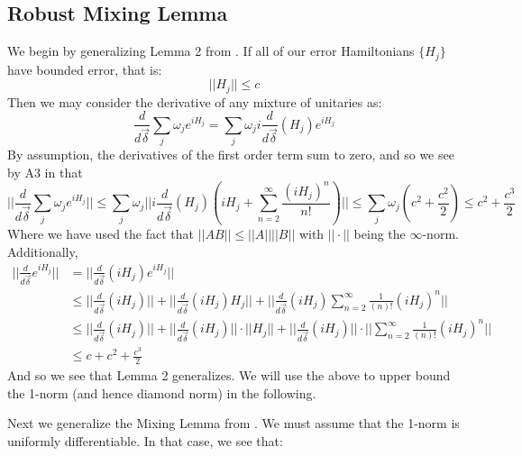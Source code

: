 \documentclass[aps,nofootinbib,pra,notitlepage,twocolumn]{revtex4-1}
\newcommand{\deriv}[0]{{\frac{d}{d\vec{\delta}}}}
\def\id{\mbox{\small 1} \!\! \mbox{1}}
\begin{document}
\subsection{Robust Mixing Lemma}
We begin by generalizing Lemma 2 from \cite{Campbell2017}. If all of our error Hamiltonians $\{H_j\}$ have bounded error, that is:
\begin{equation}
||H_j||\leq c
\end{equation}
Then we may consider the derivative of any mixture of unitaries as:
\begin{equation}
\deriv\sum_j \omega_je^{iH_j} = \sum_j\omega_ji\deriv (H_j)e^{iH_j}
\end{equation}
By assumption, the derivatives of the first order term sum to zero, and so we see by A3 in \cite{Campbell2017} that
\begin{equation}
||\deriv\sum_j\omega_je^{iH_j}|| \leq \sum_j\omega_j||i\deriv (H_j)(iH_j + \sum_{n=2}^{\infty}\frac{(iH_j)^n}{n!})|| \leq \sum_j\omega_j(c^2 + \frac{c^2}{2}) \leq c^2 + \frac{c^3}{2}
\end{equation}
Where we have used the fact that $||AB|| \leq ||A||||B||$ with $||\cdot||$ being the $\infty$-norm.
Additionally, 
\begin{align}
||\deriv e^{iH_j}|| &= ||\deriv(iH_j)e^{iH_j}|| \\
&\leq ||\deriv(iH_j)|| + ||\deriv(iH_j)H_j|| +  ||\deriv(iH_j)\sum^{\infty}_{n=2}\frac{1}{(n)!}(iH_j)^n|| \\
&\leq ||\deriv(iH_j)|| + ||\deriv(iH_j)||\cdot||H_j|| +  ||\deriv(iH_j)||\cdot||\sum^{\infty}_{n=2}\frac{1}{(n)!}(iH_j)^n||\\
&\leq c + c^2 + \frac{c^3}{2}
\end{align}
And so we see that Lemma 2 generalizes. We will use the above to upper bound the 1-norm (and hence diamond norm) in the following.

Next we generalize the Mixing Lemma from \cite{Campbell2017}. We must assume that the 1-norm is uniformly differentiable. In that case, we see that:
\end{document}
